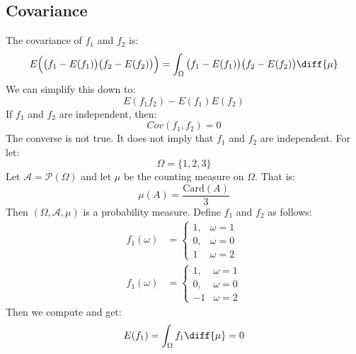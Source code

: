     \subsection{Covariance}
        The covariance of $f_{1}$ and $f_{2}$ is:
        \begin{equation}
            E\Big(\big(f_{1}-E(f_{1})\big)
                \big(f_{2}-E(f_{2})\big)\Big)
            =\int_{\Omega}\big(f_{1}-E(f_{1})\big)
                \big(f_{2}-E(f_{2})\big)\diff{\mu}
        \end{equation}
        We can simplify this down to:
        \begin{equation}
            E(f_{1}f_{2})-E(f_{1})E(f_{2})
        \end{equation}
        If $f_{1}$ and $f_{2}$ are independent, then:
        \begin{equation}
            Cov(f_{1},f_{2})=0
        \end{equation}
        The converse is not true. It does not imply that
        $f_{1}$ and $f_{2}$ are independent.
        For let:
        \begin{equation}
            \Omega=\{1,2,3\}
        \end{equation}
        Let $\mathcal{A}=\mathcal{P}(\Omega)$ and let
        $\mu$ be the counting measure on $\Omega$. That is:
        \begin{equation}
            \mu(A)=\frac{\mathrm{Card}(A)}{3}
        \end{equation}
        Then $(\Omega,\mathcal{A},\mu)$ is a probability
        measure. Define $f_{1}$ and $f_{2}$ as follows:
        \begin{align}
            f_{1}(\omega)&=
            \begin{cases}
                1,&\omega=1\\
                0,&\omega=0\\
                1&\omega=2
            \end{cases}\\
            f_{1}(\omega)&=
            \begin{cases}
                1,&\omega=1\\
                0,&\omega=0\\
                \minus{1}&\omega=2
            \end{cases}
        \end{align}
        Then we compute and get:
        \begin{equation}
            E(f_{1})=\int_{\Omega}f_{1}\diff{\mu}=0
        \end{equation}

